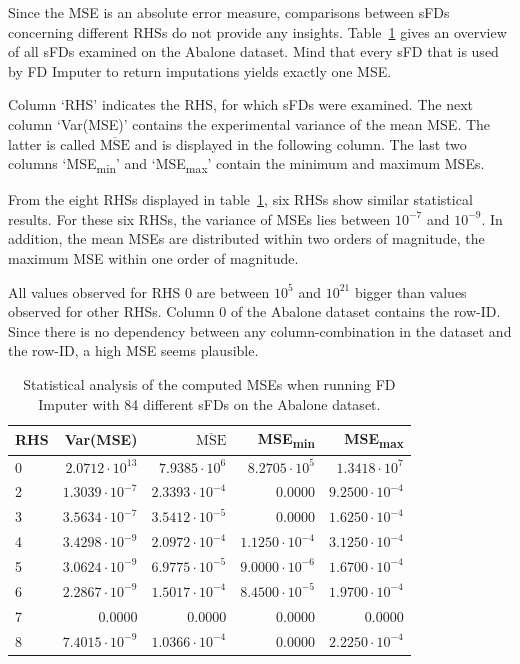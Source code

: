 Since the MSE is an absolute error measure, comparisons between sFDs concerning different RHSs do not provide any insights.
Table~\ref{tab:fd-imputer-mse-abalone} gives an overview of all sFDs examined on the Abalone dataset.
Mind that every sFD that is used by FD Imputer to return imputations yields exactly one MSE.

Column `RHS' indicates the RHS, for which sFDs were examined.
The next column `Var(MSE)' contains the experimental variance of the mean MSE.
The latter is called \( \overline{\text{MSE}} \) and is displayed in the following column.
The last two columns `MSE\textsubscript{min}' and `MSE\textsubscript{max}' contain the minimum and maximum MSEs.

From the eight RHSs displayed in table~\ref{tab:fd-imputer-mse-abalone}, six RHSs show similar statistical results.
For these six RHSs, the variance of MSEs lies between \( 10^{-7} \) and \( 10^{-9} \).
In addition, the mean MSEs are distributed within two orders of magnitude, the maximum MSE within one order of magnitude.

All values observed for RHS 0 are between \( 10^{5} \) and \( 10^{21} \) bigger than values observed for other RHSs.
Column 0 of the Abalone dataset contains the row-ID.
Since there is no dependency between any column-combination in the dataset and the row-ID, a high MSE seems plausible.

\begin{table}[ht]
    \centering
    \begin{tabular}{lrrrr}
        \toprule
        \toprule
        RHS & Var(MSE) & \( \overline{\text{MSE}} \) & MSE\textsubscript{min} & MSE\textsubscript{max} \\
        \midrule
        0 & \( 2.0712 \cdot 10^{13} \) & \( 7.9385 \cdot 10^{6} \) & \( 8.2705 \cdot 10^{5} \) & \( 1.3418 \cdot 10^{7} \) \\
        2 & \( 1.3039 \cdot 10^{-7} \) & \( 2.3393 \cdot 10^{-4} \) & 0.0000 & \( 9.2500 \cdot 10^{-4} \) \\
        3 & \( 3.5634 \cdot 10^{-7} \) & \( 3.5412 \cdot 10^{-5} \) & 0.0000 & \( 1.6250 \cdot 10^{-4} \) \\
        4 & \( 3.4298 \cdot 10^{-9} \) & \( 2.0972 \cdot 10^{-4} \) & \( 1.1250 \cdot 10^{-4} \) & \( 3.1250 \cdot 10^{-4} \) \\
        5 & \( 3.0624 \cdot 10^{-9} \) & \( 6.9775 \cdot 10^{-5} \) & \( 9.0000 \cdot 10^{-6} \) & \( 1.6700 \cdot 10^{-4} \) \\
        6 & \( 2.2867 \cdot 10^{-9} \) & \( 1.5017 \cdot 10^{-4} \) & \( 8.4500 \cdot 10^{-5} \) & \( 1.9700 \cdot 10^{-4} \) \\
        7 & 0.0000 & 0.0000 & 0.0000 & 0.0000 \\
        8 & \( 7.4015 \cdot 10^{-9} \) & \( 1.0366 \cdot 10^{-4} \) & 0.0000 & \( 2.2250 \cdot 10^{-4} \) \\
        \bottomrule
        \bottomrule
    \end{tabular}
    \caption{Statistical analysis of the computed MSEs when running FD Imputer with 84 different sFDs on the Abalone dataset.}\label{tab:fd-imputer-mse-abalone}
\end{table}

